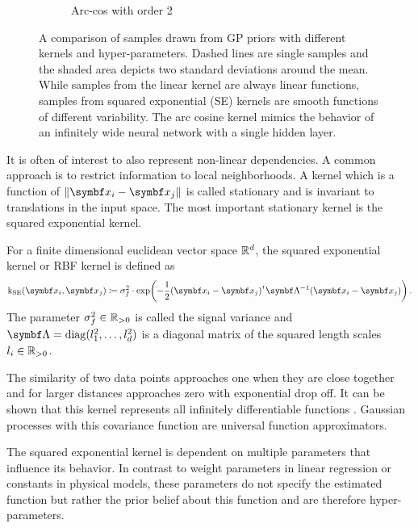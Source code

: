 \begin{figure}[p]
\begin{subfigure}[b]{\halffigurewidth}
{            Arc-cos with order 2
            \label{fig:gp:gp_samples:arccos:2}
        }
    \end{subfigure}
    \caption[Samples from GP priors]{
        \label{fig:gp:gp_samples}
        A comparison of samples drawn from GP priors with different kernels and hyper-parameters.
        Dashed lines are single samples and the shaded area depicts two standard deviations around the mean.
        While samples from the linear kernel are always linear functions, samples from squared exponential (SE) kernels are smooth functions of different variability.
        The arc cosine kernel mimics the behavior of an infinitely wide neural network with a single hidden layer.
    }
\end{figure}

It is often of interest to also represent non-linear dependencies.
A common approach is to restrict information to local neighborhoods.
A kernel which is a function of $\norm{\mat{x}_i - \mat{x}_j}$ is called stationary and is invariant to translations in the input space.
The most important stationary kernel is the squared exponential kernel.
\begin{definition}
    \label{def:gp:rbf_kernel}
    For a finite dimensional euclidean vector space $\mathbb{R}^d$, the squared exponential kernel or RBF kernel is defined as
    \begin{equation}
        \K_{\text{SE}}(\mat{x}_i, \mat{x}_j) \coloneqq \sigma_f^2 \cdot \exp\!\left( -\frac{1}{2} (\mat{x}_i - \mat{x}_j)\tran \mat{\Lambda}^{-1} (\mat{x}_i - \mat{x}_j) \right).
    \end{equation}
    The parameter $\sigma_f^2 \in \mathbb{R}_{>0}$ is called the signal variance and $\mat{\Lambda} = \diag(l_1^2, \dots, l_d^2)$ is a diagonal matrix of the squared length scales $l_i \in \mathbb{R}_{>0}$.
\end{definition}
The similarity of two data points approaches one when they are close together and for larger distances approaches zero with exponential drop off.
It can be shown that this kernel represents all infinitely differentiable functions \cite{rasmussen_gaussian_2006}.
Gaussian processes with this covariance function are universal function approximators.

The squared exponential kernel is dependent on multiple parameters that influence its behavior.
In contrast to weight parameters in linear regression or constants in physical models, these parameters do not specify the estimated function but rather the prior belief about this function and are therefore hyper-parameters.

